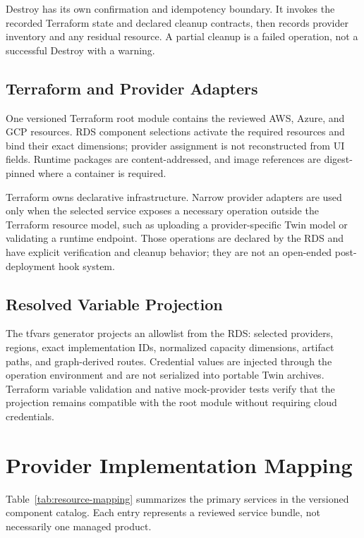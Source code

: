 Destroy has its own confirmation and idempotency boundary. It invokes the
recorded Terraform state and declared cleanup contracts, then records provider
inventory and any residual resource. A partial cleanup is a failed operation,
not a successful Destroy with a warning.

\subsection{Terraform and Provider Adapters}
\label{sec:provider-abstraction}
\label{sec:iac-organization}
\label{sec:hybrid-model}

One versioned Terraform root module contains the reviewed AWS, Azure, and GCP
resources. RDS component selections activate the required resources and bind
their exact dimensions; provider assignment is not reconstructed from UI
fields. Runtime packages are content-addressed, and image references are
digest-pinned where a container is required.

Terraform owns declarative infrastructure. Narrow provider adapters are used
only when the selected service exposes a necessary operation outside the
Terraform resource model, such as uploading a provider-specific Twin model or
validating a runtime endpoint. Those operations are declared by the RDS and
have explicit verification and cleanup behavior; they are not an open-ended
post-deployment hook system.

\subsection{Resolved Variable Projection}
\label{sec:tfvars-pipeline}

The tfvars generator projects an allowlist from the RDS: selected providers,
regions, exact implementation IDs, normalized capacity dimensions, artifact
paths, and graph-derived routes. Credential values are injected through the
operation environment and are not serialized into portable Twin archives.
Terraform variable validation and native mock-provider tests verify that the
projection remains compatible with the root module without requiring cloud
credentials.

\section{Provider Implementation Mapping}
\label{sec:resource-mapping}

Table~\ref{tab:resource-mapping} summarizes the primary services in the
versioned component catalog. Each entry represents a reviewed service bundle,
not necessarily one managed product.

